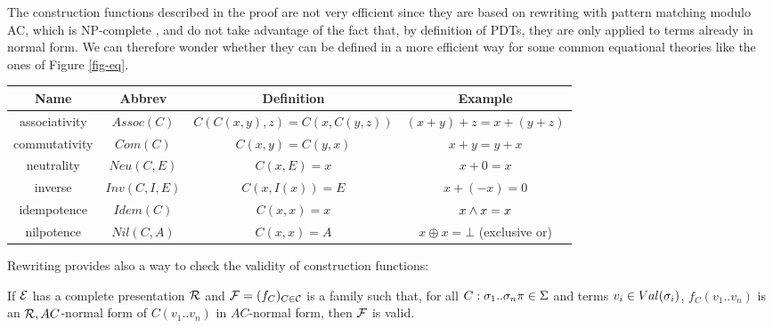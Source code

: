 The construction functions described in the proof are not very
efficient since they are based on rewriting with pattern matching
modulo AC, which is NP-complete \cite{benanav87jsc}, and do not take
advantage of the fact that, by definition of PDTs, they are only
applied to terms already in normal form. We can therefore wonder
whether they can be defined in a more efficient way for some common
equational theories like the ones of Figure \ref{fig-eq}.


\begin{figure*}
\centering\caption{Some common equations on binary constructors\label{fig-eq}}\vsp[2mm]
\begin{tabular}{|c|c|c|c|}\hline
\bf Name & \bf Abbrev & \bf Definition & \bf Example\\\hline
associativity & $Assoc(C)$ & $C(C(x,y),z)=C(x,C(y,z))$ & $(x+y)+z=x+(y+z)$\\\hline
commutativity & $Com(C)$ & $C(x,y)=C(y,x)$ & $x+y=y+x$\\\hline
neutrality & $Neu(C,E)$ & $C(x,E)=x$ & $x+0=x$\\\hline
inverse & $Inv(C,I,E)$ & $C(x,I(x))=E$ & $x+(-x)=0$\\\hline
idempotence & $Idem(C)$ & $C(x,x)=x$ & $x\wedge x=x$\\\hline
nilpotence & $Nil(C,A)$ & $C(x,x)=A$ & $x\oplus x=\bot$ (exclusive or)\\\hline
\end{tabular}
\end{figure*}


Rewriting provides also a way to check the validity of construction
functions:

\begin{thm}
\label{thm-valid}
If $\mathcal{E}$ has a complete presentation $\mathcal{R}$ and $\mathcal{F}=(f_C)_{C\in\mathcal{C}}$
is a family such that, for all $C:\sigma_1..\sigma_n\pi\in\Sigma$ and terms
$v_i\in Val(\sigma_i)$, $f_C(v_1..v_n)$ is an $\mathcal{R},AC$-normal form of
$C(v_1..v_n)$ in $AC$-normal form, then $\mathcal{F}$ is valid.
\end{thm}

